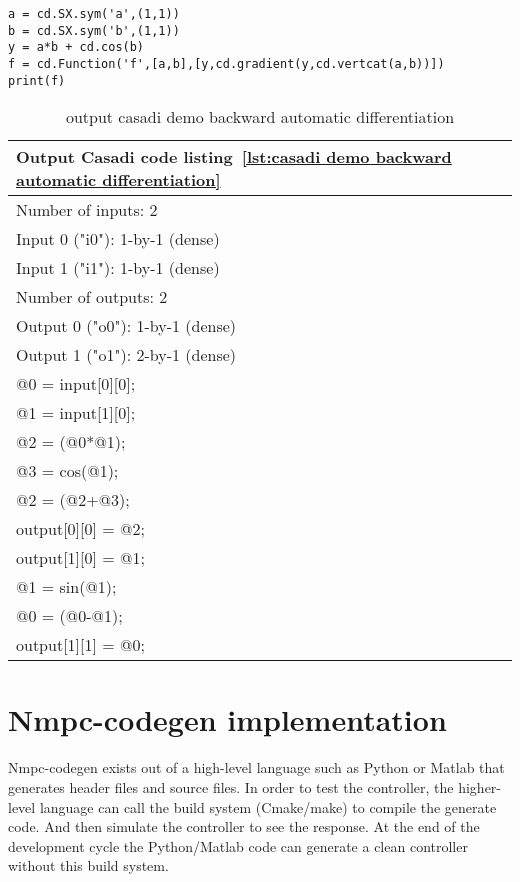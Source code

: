 \begin{lstlisting}[caption={Casadi example automatic backward differentiation},label={lst:casadi demo backward automatic differentiation}]
a = cd.SX.sym('a',(1,1))
b = cd.SX.sym('b',(1,1))
y = a*b + cd.cos(b)
f = cd.Function('f',[a,b],[y,cd.gradient(y,cd.vertcat(a,b))])
print(f)
\end{lstlisting}


\begin{table}
	\begin{center}
		\begin{tabular}{ |l|  }
			\hline
			Output Casadi code listing~\ref{lst:casadi demo backward automatic differentiation} \\
			\hline
			Number of inputs: 2 \\
			Input 0 ("i0"): 1-by-1 (dense) \\
			Input 1 ("i1"): 1-by-1 (dense) \\
			Number of outputs: 2 \\
			Output 0 ("o0"): 1-by-1 (dense) \\
			Output 1 ("o1"): 2-by-1 (dense) \\
			@0 = input[0][0]; \\
			@1 = input[1][0]; \\
			@2 = (@0*@1); \\
			@3 = cos(@1); \\
			@2 = (@2+@3); \\
			output[0][0] = @2; \\
			output[1][0] = @1; \\
			@1 = sin(@1); \\
			@0 = (@0-@1); \\
			output[1][1] = @0; \\
			\hline   
		\end{tabular}
		\caption{output casadi demo backward automatic differentiation}
		\label{tbl:output casadi demo backward automatic differentiation}
	\end{center}
\end{table}


\section{Nmpc-codegen implementation}
Nmpc-codegen exists out of a high-level language such as Python or Matlab that generates header files and source files. In order to test the controller, the higher-level language can call the build system (Cmake/make) to compile the generate code. And then simulate the controller to see the response. At the end of the development cycle the Python/Matlab code can generate a clean controller without this build system.

